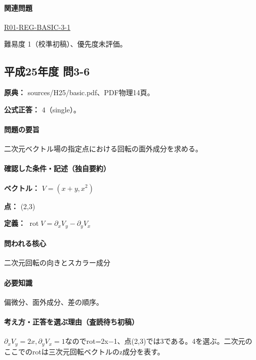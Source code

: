 \paragraph{関連問題} \hyperref[q:r01-reg-basic-3-1]{R01-REG-BASIC-3-1}

\par 難易度 1（校準初稿）、優先度未評価。

\subsection{平成25年度 問3-6}
\label{q:h25-reg-basic-3-6}

\noindent\textbf{原典：} sources/H25/basic.pdf、PDF物理14頁。

\textbf{公式正答：} 4（single）。

\paragraph{問題の要旨} 二次元ベクトル場の指定点における回転の面外成分を求める。

\paragraph{確認した条件・記述（独自要約）}\mbox{}\par

\noindent\textbf{ベクトル：} \(V=(x+y,x^2)\)\par

\noindent\textbf{点：} (2,3)\par

\noindent\textbf{定義：} \(\operatorname{rot}V=\partial_xV_y-\partial_yV_x\)\par

\paragraph{問われる核心} 二次元回転の向きとスカラー成分

\paragraph{必要知識} 偏微分、面外成分、差の順序。

\paragraph{考え方・正答を選ぶ理由（査読待ち初稿）} \(\partial_xV_y=2x,\partial_yV_x=1\)なのでrot=\allowbreak{}2x−1、点(2,3)では3である。4を選ぶ。二次元のここでのrotは三次元回転ベクトルのz成分を表す。

